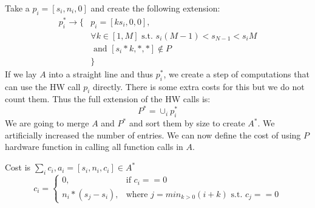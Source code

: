 \documentclass{IEEEtran}
\begin{document}
Take a $p_i =[s_i, n_i,0]$ and create the following extension:
\begin{equation}
  \begin{split}
    p_i^*  \rightarrow   \{ & p_i = [ ks_i,0,0 ], \\
    & \forall k \in [1, M]  \mbox{ s.t. } s_i(M-1)< s_{N-1}< s_iM \\
    &\mbox{ and } [s_i*k,*,*] \not \in P\\
    &\}
  \end{split}
\end{equation}
If we lay $A$ into a straight line and thus $p_i^*$, we create a step
of computations that can use the HW call $p_i$ directly. There is some
extra costs for this but we do not count them. Thus the full extension
of the HW calls is:
\begin{equation}
  P^* = \cup_ip_i^*
\end{equation}
We are going to merge $A$ and $P^*$ and sort them by size to create
$A^*$. We artificially increased the number of entries. We can now
define the cost of using $P$ hardware function in calling all function
calls in $A$. 

Cost is  $\sum_i c_i, a_i = [s_i,n_i,c_i] \in A^*$
\begin{equation}
  c_i =
  \begin{cases}
     0, & \text{if } c_i==0 \\
     n_i*(s_j-s_i), & \text{where } j = min_{k>0}(i+k) \mbox{ s.t. }c_j==0  
  \end{cases}
\end{equation}




 
\end{document}
